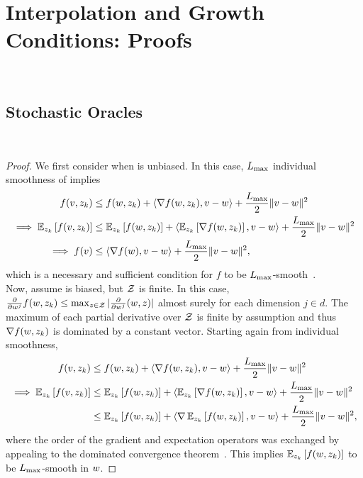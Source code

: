 
\chapter{Interpolation and Growth Conditions: Proofs}~\label{app:interpolation-gc}

\section{Stochastic Oracles}~\label{app:stochastic-oracles}

\indSmoothToSmooth*
\begin{proof}
    We first consider when \oracle{} is unbiased. In this case, \( L_{\text{max}} \) individual smoothness of \oracle{} implies
    \begin{align*}
        f(v, z_{k}) &\leq f(w, z_{k}) + \left\langle\nabla f(w, z_{k}), v - w\right\rangle + \frac{L_{\text{max}}}{2} \|v - w\|^2\\
        \implies \mathbb{E}_{z_{k}} \left[f(v, z_{k})\right] &\leq \mathbb{E}_{z_{k}} \left[f(w, z_{k})\right] + \left\langle\mathbb{E}_{z_{k}} \left[\nabla f(w, z_{k})\right], v - w\right\rangle + \frac{L_{\text{max}}}{2} \|v - w\|^2\\
        \implies f(v) &\leq \left\langle\nabla f(w), v - w\right\rangle + \frac{L_{\text{max}}}{2}\|v - w\|^2, 
    \end{align*}
    which is a necessary and sufficient condition for \( f \) to be \( L_{\text{max}} \)-smooth~\citep[Theorem 2.1.5]{nesterov2004lectures}.\\

    Now, assume \oracle{} is biased, but \( \mathcal{Z} \) is finite.
    In this case, \( \frac{\partial}{\partial w^j} f(w, z_{k}) \leq \max_{z \in \mathcal{Z}} | \frac{\partial}{\partial w^j} (w, z)| \) almost surely for each dimension \( j \in d \).
    The maximum of each partial derivative over \( \mathcal{Z} \) is finite by assumption and thus \( \nabla f(w, z_{k}) \) is dominated by a constant vector.
    Starting again from individual smoothness,
    \begin{align*}
        f(v, z_{k}) &\leq f(w, z_{k}) + \left\langle\nabla f(w, z_{k}), v - w\right\rangle + \frac{L_{\text{max}}}{2} \|v - w\|^2\\
        \implies \mathbb{E}_{z_{k}} \left[f(v, z_{k})\right] &\leq \mathbb{E}_{z_{k}} \left[f(w, z_{k})\right] + \left\langle\mathbb{E}_{z_{k}} \left[\nabla f(w, z_{k})\right], v - w\right\rangle + \frac{L_{\text{max}}}{2} \|v - w\|^2\\
                                     &\leq \mathbb{E}_{z_{k}} \left[f(w, z_{k})\right] + \left\langle\nabla \, \mathbb{E}_{z_{k}} \left[f(w, z_{k})\right], v - w\right\rangle + \frac{L_{\text{max}}}{2} \|v - w\|^2,
    \end{align*}
    where the order of the gradient and expectation operators was exchanged by appealing to the dominated convergence theorem~\citep[Theorem 4.16]{ccinlar2011probability}.
    This implies \( \mathbb{E}_{z_{k}}\left[f(w, z_{k})\right] \) to be \( L_{\text{max}} \)-smooth in \( w \).
\end{proof}


